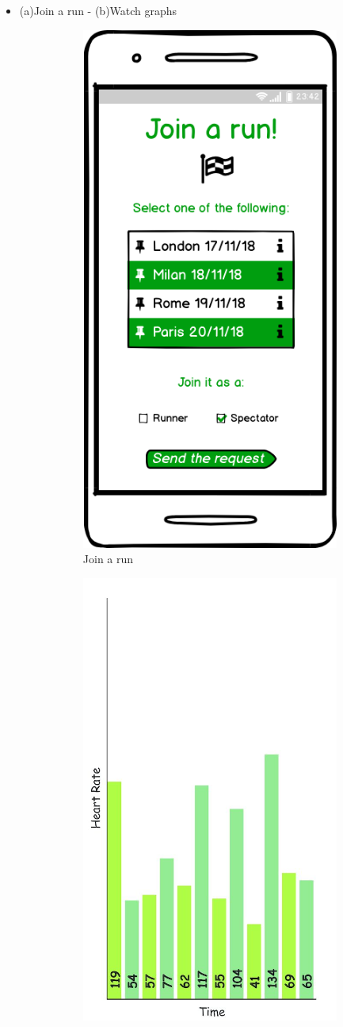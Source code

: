 \documentclass{article}
\begin{document}
\begin{legal}
\begin{legal}
\begin{legal}
{\begin{itemize}
\begin{figure}[H]
\begin{subfigure}{.5\textwidth}
 						 \caption{Third party Login or Sign Up}
						\end{subfigure}
						\end{figure}
					\item  (a)Join a run - (b)Watch graphs
						\begin{figure}[H]
						\centering
						\begin{subfigure}{.5\textwidth}
  						\centering
  						\includegraphics[width=.4\linewidth]{../images/mockups/Join-a-run.png}
 						 \caption{Join a run}
						\end{subfigure}%
						\begin{subfigure}{.5\textwidth}
 						 \centering
 						 \includegraphics[width=.47\linewidth]{../images/mockups/Graph.png}

\end{subfigure}
\end{figure}
\end{itemize}}
\end{legal}
\end{legal}
\end{legal}
\end{document}
